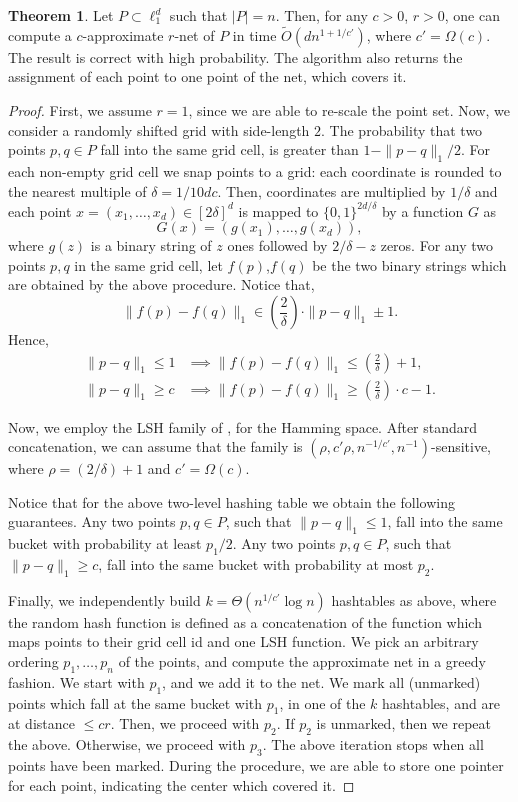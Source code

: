 \documentclass[10pt,a4paper,twoside]{book}
\theoremstyle{definition}
\newtheorem{theorem}[definition]{Theorem}
\theoremstyle{remark}
\begin{document}
\begin{theorem} \label{theorem:apprnets} 
Let $P\subset \ell_1^d$ such that $|P|=n$. Then, for any $c>0$, $r>0$, one can compute a $c$-approximate $r$-net of $P$ in time $\tilde{O}(dn^{1+1/c'})$, where $c'=\Omega(c)$. The result is correct with high probability. The algorithm also returns the assignment of each point to one point of the net, which covers it.
\end{theorem}
\begin{proof}
First, we assume $r=1$, since we are able to re-scale the point set. Now, we consider a randomly shifted grid with side-length $2$. 
The probability that two points $p,q\in P$ fall into the same grid cell, is greater than $1-\|p-q\|_1/2$. For each non-empty grid cell we snap points to a grid: each coordinate is rounded to the nearest multiple of $\delta=1/10dc$.
Then, coordinates are multiplied by $1/\delta$ and each point $x=(x_1,\ldots,x_d) \in [2\delta]^d$ is mapped to $\{0,1\}^{2d /\delta}$ by a function $G$ as
\[
G(x)=(g(x_1),\ldots,g(x_d)),
\]
where $g(z)$ is a binary string of $z$ ones followed by $2/\delta -z$ zeros. For any two points $p,q$ in the same grid cell, let $f(p)$,$f(q)$ be the two binary strings which are obtained by the above procedure. Notice that,
\begin{equation*}
\|f(p)-f(q)\|_1\in \left(\frac{2}{\delta}\right) \cdot \|p-q\|_1  \pm 1. 
\end{equation*}
Hence,
\begin{align*}
    \|p-q\|_1 \leq 1 &\implies \|f(p)-f(q)\|_1 \leq \left(\frac{2}{\delta}\right)+1 ,\\[2pt]
    \|p-q\|_1 \geq c &\implies \|f(p)-f(q)\|_1 \geq \left(\frac{2}{\delta}\right)\cdot c-1 .
\end{align*}

Now, we employ the LSH family of \cite{HIM12}, for the Hamming space. After standard concatenation, we can assume that the family is $ (\rho,c'\rho,n^{-1/c'},n^{-1})$-sensitive, where $\rho=\left({2}/{\delta}\right)+1$ and $c'= \Omega(c)$. 

Notice that for the above two-level hashing table we obtain the following guarantees. 
Any two points $p,q\in P$, such that $\|p-q\|_1\leq 1$, fall into the same bucket with probability at least $p_1/2$. Any two points $p,q\in P$, such that $\|p-q\|_1\geq c$, fall into the same bucket with probability at most $p_2$. 

Finally, we independently build $k=\Theta(n^{1/c'} \log n)$ hashtables as above, where the random hash function is defined as a concatenation of the function which maps points to their grid cell id and one LSH function. We pick an arbitrary ordering $p_1,\ldots,p_n$ of the points, and compute the approximate net in a greedy fashion. We start with $p_1$, and we add it to the net. We mark all (unmarked) points which fall at the same bucket with $p_1$, in one of the $k$ hashtables, and are at distance $\leq c r$. Then, we proceed with $p_2$. If $p_2$ is unmarked, then we repeat the above. Otherwise, we proceed with $p_3$. The above iteration stops when all points have been marked. During the procedure, we are able to store one pointer for each point, indicating the center which covered it. 


\end{proof}
\end{document}
